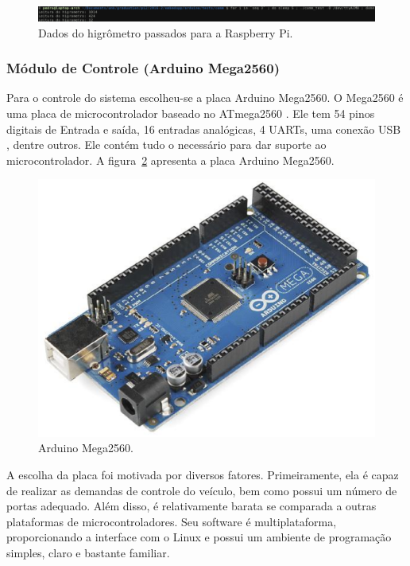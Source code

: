 			\begin{figure}[!htbp]
			\begin{center}
			\includegraphics[width=\textwidth]{figuras/fc28_raspberry.eps}
			\caption{\label{fig:fc28rasp}Dados do higrômetro passados para a Raspberry Pi.}
			\end{center}
			\end{figure}

  \subsubsection{Módulo de Controle (Arduino Mega2560)}

  Para o controle do sistema escolheu-se a placa Arduino Mega2560.
  O Mega2560 é uma placa de microcontrolador baseado no ATmega2560 .
  Ele tem 54 pinos digitais de Entrada e saída, 16 entradas analógicas,
  4 UARTs, uma conexão USB , dentre outros. Ele contém tudo o necessário
  para dar suporte ao microcontrolador. A figura~\ref{fig:arduino} apresenta a placa
  Arduino Mega2560.

  \begin{figure}[!htbp]
  \begin{center}
  \includegraphics[width=.6\textwidth]{figuras/arduino.eps}
  \caption{\label{fig:arduino}Arduino Mega2560.}
  \end{center}
  \end{figure}

  A escolha da placa foi motivada por diversos fatores.
  Primeiramente, ela é capaz de realizar as demandas de controle do
  veículo, bem como possui um número de portas adequado. Além disso,
  é relativamente barata se comparada a outras plataformas de
  microcontroladores. Seu software é multiplataforma, proporcionando
  a interface com o Linux e possui um ambiente de programação simples,
  claro e bastante familiar.

